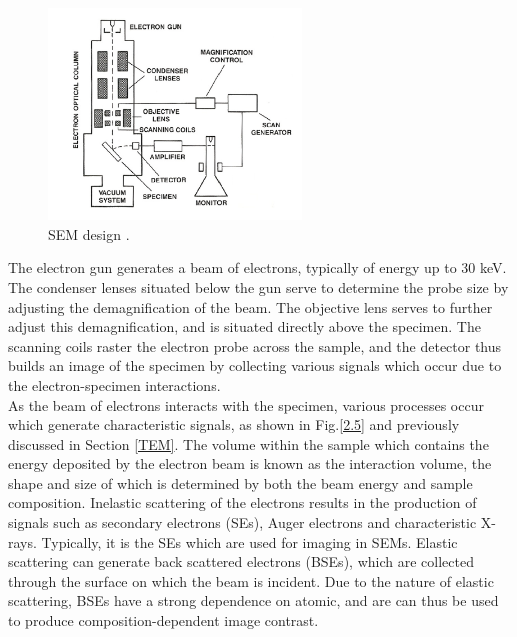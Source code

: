 \begin{figure}[h]
	\centering
	\includegraphics[width=0.6\textwidth]{Figs/Ch2/SEM.png}
	\caption {SEM design \cite{YacobiHolt1990}.}
	\label{2.4}
\end{figure}
\FloatBarrier

The electron gun generates a beam of electrons, typically of energy up to 30 keV. The condenser lenses situated below the gun serve to determine the probe size by adjusting the demagnification of the beam. The objective lens serves to further adjust this demagnification, and is situated directly above the specimen. The scanning coils raster the electron probe across the sample, and the detector thus builds an image of the specimen by collecting various signals which occur due to the electron-specimen interactions.\\
As the beam of electrons interacts with the specimen, various processes occur which generate characteristic signals, as shown in Fig.\ref{2.5} and previously discussed in Section \ref{TEM}. The volume within the sample which contains the energy deposited by the electron beam is known as the interaction volume, the shape and size of which is determined by both the beam energy and sample composition. Inelastic scattering of the electrons results in the production of signals such as secondary electrons  (SEs), Auger electrons and characteristic X-rays. Typically, it is the SEs which are used for imaging in SEMs. Elastic scattering can generate back scattered electrons  (BSEs), which are collected through the surface on which the beam is incident. Due to the nature of elastic scattering, BSEs have a strong dependence on atomic, and are can thus be used to produce composition-dependent image contrast.

